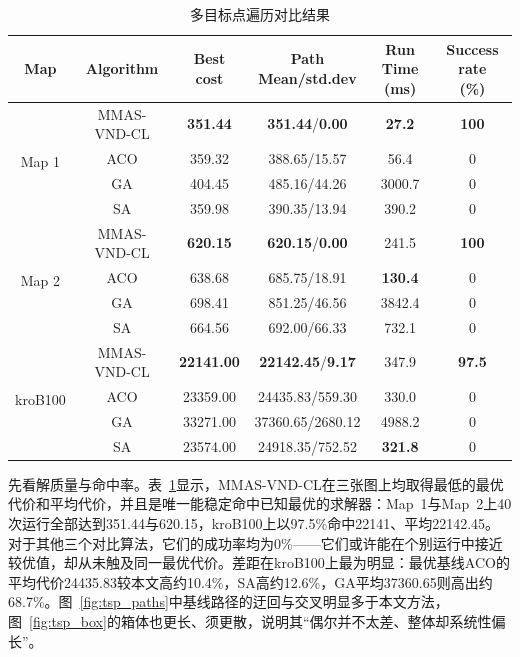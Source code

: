 \documentclass[lettersize,journal]{IEEEtran}
\begin{document}
\begin{table}[!t]
\caption{多目标点遍历对比结果}
\label{tab:tsp_cmp}
\centering
\scriptsize
\setlength{\tabcolsep}{2.5pt}
\begin{tabular}{cccccc}
\toprule
Map & Algorithm & Best cost & \makecell{Path\\Mean/std.dev} & \makecell{Run Time\\(ms)} & \makecell{Success rate\\(\%)} \\
\midrule
 \multirow{4}{*}{Map 1} & MMAS-VND-CL & \textbf{351.44} & \textbf{351.44}/\textbf{0.00} & \textbf{27.2} & \textbf{100} \\
   & ACO & 359.32 & 388.65/15.57 & 56.4 & 0 \\
   & GA & 404.45 & 485.16/44.26 & 3000.7 & 0 \\
   & SA & 359.98 & 390.35/13.94 & 390.2 & 0 \\
\midrule
 \multirow{4}{*}{Map 2} & MMAS-VND-CL & \textbf{620.15} & \textbf{620.15}/\textbf{0.00} & 241.5 & \textbf{100} \\
   & ACO & 638.68 & 685.75/18.91 & \textbf{130.4} & 0 \\
   & GA & 698.41 & 851.25/46.56 & 3842.4 & 0 \\
   & SA & 664.56 & 692.00/66.33 & 732.1 & 0 \\
\midrule
 \multirow{4}{*}{kroB100} & MMAS-VND-CL & \textbf{22141.00} & \textbf{22142.45}/\textbf{9.17} & 347.9 & \textbf{97.5} \\
   & ACO & 23359.00 & 24435.83/559.30 & 330.0 & 0 \\
   & GA & 33271.00 & 37360.65/2680.12 & 4988.2 & 0 \\
   & SA & 23574.00 & 24918.35/752.52 & \textbf{321.8} & 0 \\
\bottomrule
\end{tabular}
\end{table}

先看解质量与命中率。表~\textcolor{blue}{\ref{tab:tsp_cmp}}显示，MMAS-VND-CL在三张图上均取得最低的最优代价和平均代价，并且是唯一能稳定命中已知最优的求解器：Map~1与Map~2上40次运行全部达到351.44与620.15，kroB100上以97.5\%命中22141、平均22142.45。对于其他三个对比算法，它们的成功率均为0\%——它们或许能在个别运行中接近较优值，却从未触及同一最优代价。差距在kroB100上最为明显：最优基线ACO的平均代价24435.83较本文高约10.4\%，SA高约12.6\%，GA平均37360.65则高出约68.7\%。图~\textcolor{blue}{\ref{fig:tsp_paths}}中基线路径的迂回与交叉明显多于本文方法，图~\textcolor{blue}{\ref{fig:tsp_box}}的箱体也更长、须更散，说明其“偶尔并不太差、整体却系统性偏长”。
\end{document}
